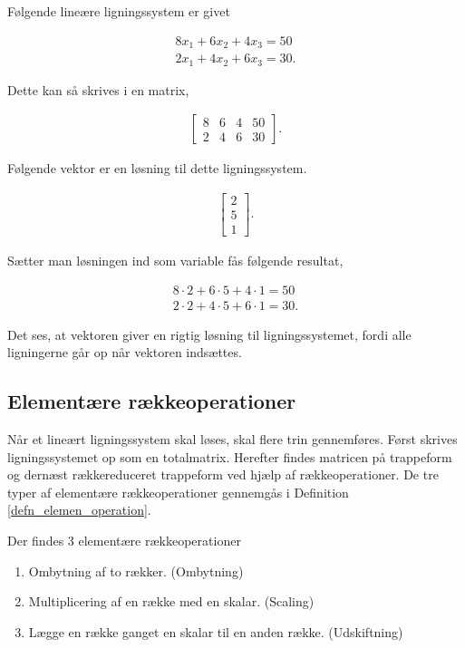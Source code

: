 \begin{eks}
Følgende lineære ligningssystem er givet

\begin{align*}
8x_1+6x_2+4x_3 = 50 \\
2x_1+4x_2+6x_3 = 30.
\end{align*}

Dette kan så skrives i en matrix,

\begin{align*}
\begin{bmatrix}
8 & 6 & 4 & 50 \\
2 & 4 & 6 & 30
\end{bmatrix}.
\end{align*}

Følgende vektor er en løsning til dette ligningssystem.

\begin{align*}
\begin{bmatrix}
2 \\
5 \\
1
\end{bmatrix}.
\end{align*}

Sætter man løsningen ind som variable fås følgende resultat,

\begin{align*}
8 \cdot 2 + 6 \cdot 5 + 4 \cdot 1 = 50 \\
2 \cdot 2 + 4 \cdot 5 + 6 \cdot 1 = 30.
\end{align*}

Det ses, at vektoren giver en rigtig løsning til ligningssystemet, fordi alle ligningerne går op når vektoren indsættes. 

\end{eks}

\subsection{Elementære rækkeoperationer}
Når et lineært ligningssystem skal løses, skal flere trin gennemføres. Først skrives ligningssystemet op som en totalmatrix. Herefter findes matricen på trappeform og dernæst rækkereduceret trappeform ved hjælp af rækkeoperationer. De tre typer af elementære rækkeoperationer gennemgås i Definition \ref{defn_elemen_operation}. \\

\begin{defn}
Der findes 3 elementære rækkeoperationer
\begin{enumerate}
\item Ombytning af to rækker. (Ombytning)
\item Multiplicering af en række med en skalar. (Scaling)
\item Lægge en række ganget en skalar til en anden række. (Udskiftning)
\end{enumerate}
\label{defn_elemen_operation}
\end{defn}

